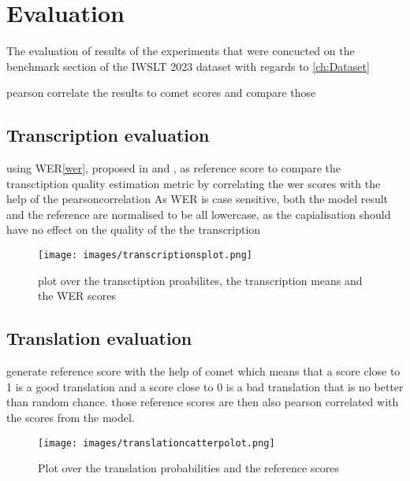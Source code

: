 
\chapter{Evaluation}
\label{ch:Evaluation}
The evaluation of results of the experiments that were concucted on the benchmark section of the IWSLT 2023 dataset \cite{sperber2024evaluating} with regards to \ref{ch:Dataset}

pearson correlate \cite{2020SciPy-NMeth} the results to comet scores and compare those 


\section{Transcription evaluation}

using WER\ref{wer}, proposed in \cite{woodard1982} and \cite{morris2004}, as reference score to compare the transctiption quality estimation metric by correlating the wer scores with the help of the pearsoncorrelation \cite{2020SciPy-NMeth}
As WER is case sensitive, both the model result and the reference are normalised to be all lowercase, as the capialisation should have no effect on the quality of the the transcription
\begin{figure}
    \centering
    \texttt{[image: images/transcriptionsplot.png]}
    \caption{plot over the transctiption proabilites, the transcription means and the WER scores}
    \label{fig:transcript scatter plot}
\end{figure}

\section{Translation evaluation}

generate reference score with the help of comet \cite{rei-etal-2020-comet} which means that a score close to 1 is a good translation and a score close to 0 is a bad translation that is no better than random chance.
those reference scores are then also pearson correlated with the scores from the model. 
\begin{figure}
    \centering
    \texttt{[image: images/translationcatterpolot.png]}
    \caption{Plot over the translation probabilities and the reference scores}
    \label{fig:translationeval scatter plot}
\end{figure}

